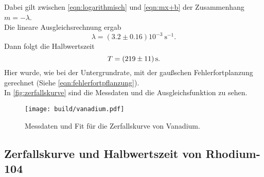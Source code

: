 Dabei gilt zwischen \autoref{eqn:logarithmisch} und \autoref{eqn:mx+b} der 
Zusammenhang $m = -\lambda$.
\\
Die lineare Ausgleichsrechnung ergab
\begin{equation}
	\lambda = (3.2 \pm 0.16) 10^{-3} \  \si{\second}^{-1}.
\end{equation}
\noindent Dann folgt die Halbwertszeit
\begin{equation}
	T = \SI{219\pm11}{\second}.
\end{equation}
Hier wurde, wie bei der Untergrundrate, mit der gaußschen Fehlerfortplanzung gerechnet (Siehe 
\autoref{eqn:fehlerfortpflanzung}).
\\
In \autoref{fig:zerfallskurve} sind die Messdaten und die Ausgleichsfunktion zu sehen.

\begin{figure}[H]
	\centering
	\texttt{[image: build/vanadium.pdf]}
	\caption{Messdaten und Fit für die Zerfallskurve von Vanadium.}
	\label{fig:zerfallskurve}
\end{figure}


\subsection{Zerfallskurve und Halbwertszeit von Rhodium-104}
\label{sec:aus:rhodium}

